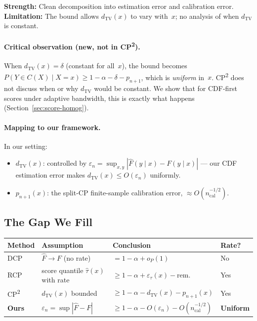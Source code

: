 \documentclass[11pt]{article}
\begin{document}
\textbf{Strength:} Clean decomposition into estimation error and
calibration error.
\textbf{Limitation:} The bound allows $d_{\mathrm{TV}}(x)$ to vary
with~$x$; no analysis of when $d_{\mathrm{TV}}$ is constant.

\paragraph{Critical observation (new, not in CP\textsuperscript{2}).}
When $d_{\mathrm{TV}}(x) = \delta$ (constant for all~$x$), the bound
becomes $P(Y \in C(X) \mid X = x) \ge 1 - \alpha - \delta - p_{n+1}$,
which is \emph{uniform} in~$x$. CP\textsuperscript{2} does not discuss
when or why $d_{\mathrm{TV}}$ would be constant. We show that for
CDF-first scores under adaptive bandwidth, this is exactly what happens
(Section~\ref{sec:score-homog}).

\paragraph{Mapping to our framework.}
In our setting:
\begin{itemize}
  \item $d_{\mathrm{TV}}(x)$: controlled by
    $\varepsilon_n = \sup_{x,y}|\hat F(y \mid x) - F(y \mid x)|$ ---
    our CDF estimation error makes $d_{\mathrm{TV}}(x) \le O(\varepsilon_n)$
    uniformly.
  \item $p_{n+1}(x)$: the split-CP finite-sample calibration error,
    $\approx O(n_{\mathrm{cal}}^{-1/2})$.
\end{itemize}

\subsection{The Gap We Fill}

\begin{center}
\begin{tabular}{@{}llll@{}}
\toprule
\textbf{Method} & \textbf{Assumption} & \textbf{Conclusion} & \textbf{Rate?} \\
\midrule
DCP   & $\hat F \to F$ (no rate) & $= 1-\alpha + o_P(1)$ & No \\
RCP   & score quantile $\hat\tau(x)$ with rate
      & $\ge 1-\alpha + \varepsilon_\tau(x) - \text{rem.}$ & Yes \\
CP\textsuperscript{2}
      & $d_{\mathrm{TV}}(x)$ bounded
      & $\ge 1-\alpha - d_{\mathrm{TV}}(x) - p_{n+1}(x)$ & Yes \\
\textbf{Ours} & $\varepsilon_n = \sup|\hat F - F|$
      & $\ge 1-\alpha - O(\varepsilon_n) - O(n_{\mathrm{cal}}^{-1/2})$
      & \textbf{Uniform} \\
\bottomrule
\end{tabular}
\end{center}
\end{document}
